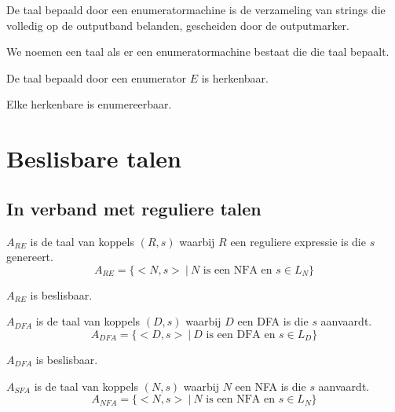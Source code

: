 \documentclass[main.tex]{subfiles}
\begin{document}
\begin{de}
  De taal bepaald door een enumeratormachine is de verzameling van strings die volledig op de outputband belanden, gescheiden door de outputmarker.
\end{de}

\begin{de}
  We noemen een taal  als er een enumeratormachine bestaat die die taal bepaalt.
\end{de}

\begin{st}
  De taal bepaald door een enumerator $E$ is herkenbaar.
\end{st}

\begin{st}
  Elke herkenbare is enumereerbaar.
\end{st}

\section{Beslisbare talen}
\label{sec:beslisbare-talen}

\subsection{In verband met reguliere talen}
\label{sec:verb-met-regul}

\begin{de}
  $A_{RE}$ is de taal van koppels $(R,s)$ waarbij $R$ een reguliere expressie is die $s$ genereert.
  \[ A_{RE} = \{ <N,s> \ |\ N \text{ is een NFA en } s \in L_{N} \} \]
\end{de}

\begin{st}
  $A_{RE}$ is beslisbaar.
\end{st}

\begin{de}
  $A_{DFA}$ is de taal van koppels $(D,s)$ waarbij $D$ een DFA is die $s$ aanvaardt.
  \[ A_{DFA} = \{ <D,s> \ |\ D \text{ is een DFA en } s \in L_{D} \} \]
\end{de}

\begin{st}
  $A_{DFA}$ is beslisbaar.
\end{st}

\begin{de}
  $A_{SFA}$ is de taal van koppels $(N,s)$ waarbij $N$ een NFA is die $s$ aanvaardt.
  \[ A_{NFA} = \{ <N,s> \ |\ N \text{ is een NFA en } s \in L_{N} \} \]
\end{de}
\end{document}
